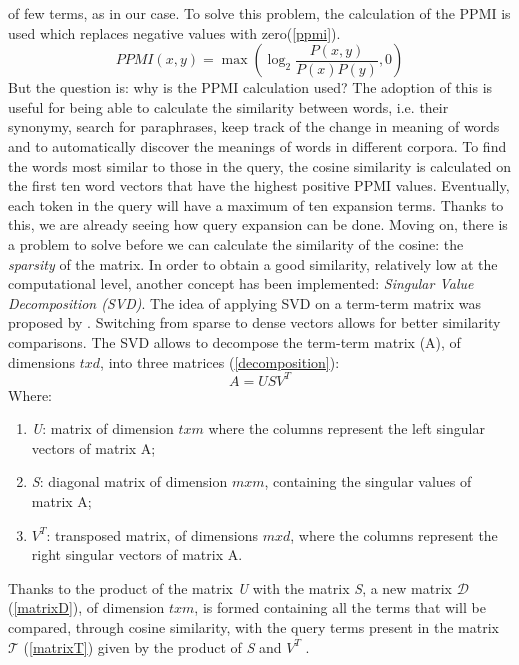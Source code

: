 of few terms, as in our case. To solve this problem, the calculation of the 
PPMI is used which replaces negative values with zero(\ref{ppmi}).
\begin{equation}\label{ppmi}
    PPMI(x,y) = \max(\log_2\frac{P(x,y)}{P(x)P(y)}, 0)
\end{equation}
But the question is: why is the PPMI calculation used? The adoption of 
this is useful for being able to calculate the similarity between words, i.e. 
their synonymy, search for paraphrases, keep track of the change in meaning 
of words and to automatically discover the meanings of words in different 
corpora. To find the words most similar to those in the query, the cosine 
similarity is calculated on the first ten word vectors that have the highest 
positive PPMI values. Eventually, each token in the query will have a maximum 
of ten expansion terms. Thanks to this, we are already seeing how 
query expansion can be done. Moving on, there is a problem to solve before we can 
calculate the similarity of the cosine: the \emph{sparsity} of the matrix. In order to 
obtain a good similarity, relatively low at the computational level, another 
concept has been implemented: \emph{Singular Value Decomposition (SVD)}. The 
idea of applying SVD on a term-term matrix was proposed by \cite{13}. Switching 
from sparse to dense vectors allows for better similarity comparisons. The 
SVD allows to decompose the term-term matrix (A), of dimensions $txd$, into 
three matrices \cite{14} (\ref{decomposition}):
\begin{equation}\label{decomposition}
    A = USV^T
\end{equation}
Where:
\begin{enumerate}
    \item \emph{U}: matrix of dimension $txm$ where the columns represent the left 
    singular vectors of matrix A;
    \item \emph{S}: diagonal matrix of dimension $mxm$, containing the singular values 
    of matrix A;
    \item \emph{$V^T$}: transposed matrix, of dimensions $mxd$, where the columns represent 
    the right singular vectors of matrix A.
\end{enumerate}
Thanks to the product of the matrix \emph{U} with the matrix \emph{S}, a new matrix 
\emph{$\mathcal{D}$} (\ref{matrixD}), of dimension $txm$, is formed containing all the terms that will be 
compared, through cosine similarity, with the query terms present in the 
matrix \emph{$\mathcal{T}$} (\ref{matrixT}) given by the product of \emph{S} and $V^T$ .
